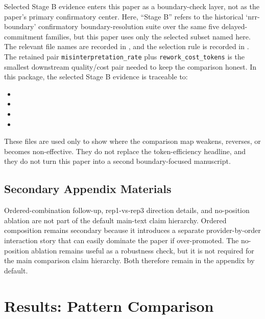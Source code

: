 \documentclass[11pt,a4paper]{article}
\begin{document}
Selected Stage B evidence enters this paper as a boundary-check layer, not as
the paper's primary confirmatory center. Here, ``Stage B'' refers to the
historical `nrr-boundary' confirmatory boundary-resolution suite over the same
five delayed-commitment families, but this paper uses only the selected subset
named here. The relevant file names are recorded in
, and the
selection rule is recorded in
. The
retained pair \texttt{misinterpretation\_rate} plus
\texttt{rework\_cost\_tokens} is the smallest downstream quality/cost pair
needed to keep the comparison honest. In this package, the selected
Stage B evidence is traceable to:
\begin{itemize}
  \item {}
  \item {}
  \item {}
  \item {}
\end{itemize}
These files are used only to show where the comparison map weakens, reverses,
or becomes non-effective. They do not replace the token-efficiency headline,
and they do not turn this paper into a second boundary-focused manuscript.

\subsection{Secondary Appendix Materials}

Ordered-combination follow-up, rep1-vs-rep3 direction details, and no-position
ablation are not part of the default main-text claim hierarchy. Ordered composition remains
secondary because it introduces a separate provider-by-order interaction story
that can easily dominate the paper if over-promoted. The no-position ablation
remains useful as a robustness check, but it is not required for the main
comparison claim hierarchy. Both therefore
remain in the appendix by default.

\section{Results: Pattern Comparison}
\label{sec:results_comparison}
\end{document}
